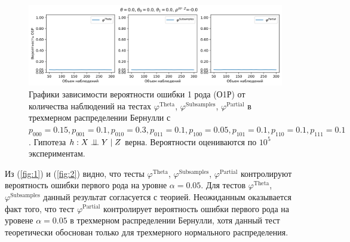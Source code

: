 \begin{figure}[H]
    \centering
    \includegraphics[scale=0.55]{images/graph2.png}
    \caption{Графики зависимости вероятности ошибки 1 рода (О1Р) от количества наблюдений
    на тестах $\varphi^{\text{Theta}}$, $\varphi^{\text{Subsamples}}$, $\varphi^{\text{Partial}}$
    в трехмерном распределении Бернулли с $p_{000}=0.15, p_{001}=0.1, p_{010}=0.3, p_{011}=0.1,
    p_{100}=0.05, p_{101}=0.1, p_{110}=0.1, p_{111}=0.1$. 
    Гипотеза $h: X \perp\!\!\!\perp Y \mid Z$ верна.
    Вероятности оцениваются по $10^5$ экспериментам.} \label{fig:2}
\end{figure}

Из (\autoref{fig:1}) и (\autoref{fig:2}) видно, что тесты $\varphi^{\text{Theta}}$, $\varphi^{\text{Subsamples}}$, 
$\varphi^{\text{Partial}}$ контролируют вероятность 
ошибки первого рода на уровне $\alpha=0.05$. Для тестов $\varphi^{\text{Theta}}$, $\varphi^{\text{Subsamples}}$
данный результат согласуется с теорией.
Неожиданным оказывается факт того,
что тест $\varphi^{\text{Partial}}$ контролирует вероятность
ошибки первого рода на уровене $\alpha=0.05$ в трехмерном
распределении Бернулли, хотя данный тест теоретически обоснован только для трехмерного нормального 
распределения.

